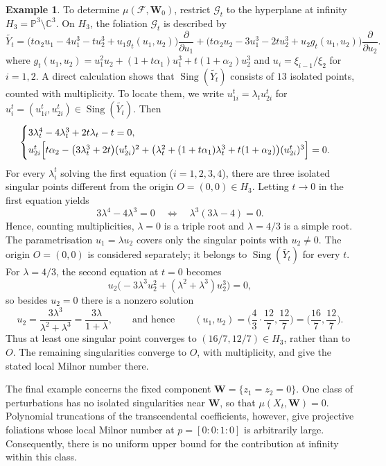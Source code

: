 \documentclass[10pt,twoside]{amsart}
\numberwithin{equation}{section}
\theoremstyle{definition}
\newtheorem{example}[proposition]{Example}
\theoremstyle{remark}
\DeclareMathOperator{\sing}{Sing}
\newcommand{\C}{\mathbb{C}}
\newcommand{\fol}{\mathcal{F}}
\newcommand{\G}{\mathcal{G}}
\newcommand{\W}{\mathbf{W}}
\begin{document}
\begin{example}
To determine $\mu(\fol,\W_0)$, restrict $\G_t$ to the hyperplane at infinity $H_3=\mathbb P^3\setminus\C^3$.
On $H_3$, the foliation $\G_t$ is described by
\[
\widetilde{Y_t}
=\bigl(t\alpha_2u_1-4u_1^3-tu_2^3+u_1g_t(u_1,u_2)\bigr)\frac{\partial}{\partial u_1}
+\bigl(t\alpha_2u_2-3u_1^3-2tu_2^3+u_2g_t(u_1,u_2)\bigr)\frac{\partial}{\partial u_2}.
\]
where $g_t(u_1,u_2)=u_1^2u_2+(1+t\alpha_1)u_1^3+t(1+\alpha_2)u_2^3$ and $u_i=\xi_{i-1}/\xi_{2}$ for $i=1,2$.
A direct calculation shows that $\sing(\widetilde{Y_t})$ consists of $13$ isolated points, counted with multiplicity.
To locate them, we write $u_{1i}^t=\lambda_t u_{2i}^t$ for $u_i^t=(u_{1i}^t,u_{2i}^t)\in \sing(\widetilde{Y_t})$.
Then
\[
\begin{cases}
3\lambda_t^4-4\lambda_t^3+2t\lambda_t-t=0,\\[2pt]
u_{2i}^t\Bigl[t\alpha_2-\bigl(3\lambda_t^3+2t\bigr)(u_{2i}^t)^2
+\bigl(\lambda_t^2+(1+t\alpha_1)\lambda_t^3+t(1+\alpha_2)\bigr)(u_{2i}^t)^3\Bigr]=0.
\end{cases}
\]
For every $\lambda_i^t$ solving the first equation ($i=1,2,3,4$), there are three isolated singular points different from the origin $O=(0,0)\in H_3$.
Letting $t\to0$ in the first equation yields
\[
3\lambda^4-4\lambda^3=0
\quad\Longleftrightarrow\quad
\lambda^3(3\lambda-4)=0.
\]
Hence, counting multiplicities, $\lambda=0$ is a triple root and $\lambda=4/3$ is a simple root.
The parametrisation $u_1=\lambda u_2$ covers only the singular points with $u_2\neq0$. The origin $O=(0,0)$ is considered separately; it belongs to $\sing(\widetilde{Y_t})$ for every $t$.
For $\lambda=4/3$, the second equation at $t=0$ becomes
\[
u_2\Big(-3\lambda^3 u_2^2+(\lambda^2+\lambda^3)u_2^3\Big)=0,
\]
so besides $u_2=0$ there is a nonzero solution
\[
u_2=\frac{3\lambda^3}{\lambda^2+\lambda^3}=\frac{3\lambda}{1+\lambda},
\qquad\text{and hence}\qquad
(u_1,u_2)=\Big(\frac{4}{3}\cdot\frac{12}{7},\frac{12}{7}\Big)=\Big(\frac{16}{7},\frac{12}{7}\Big).
\]
Thus at least one singular point converges to $(16/7,12/7)\in H_3$, rather than to $O$. The remaining singularities converge to $O$, with multiplicity, and give the stated local Milnor number there.
\end{example}


The final example concerns the fixed component $\W=\{z_1=z_2=0\}$. One class of perturbations has no isolated singularities near $\W$, so that $\mu(X_t,\W)=0$. Polynomial truncations of the transcendental coefficients, however, give projective foliations whose local Milnor number at $p=[0:0:1:0]$ is arbitrarily large. Consequently, there is no uniform upper bound for the contribution at infinity within this class.
\end{document}
